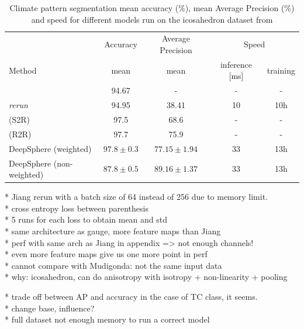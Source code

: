 \documentclass{article} %
\begin{document}
\begin{table}
	\begin{tabular}{l|c c c c}
	\multicolumn{1}{l}{} & Accuracy & Average Precision & \multicolumn{2}{c}{Speed}\\
	\cmidrule(lr){2-2} \cmidrule(lr){3-3} \cmidrule(lr){4-5}
	\multicolumn{1}{l}{Method} & mean & mean & inference [ms] & training \\ \hline
	\cite{jiang_spherical_2019} & 94.67 & - & - & -\\
	\cite{jiang_spherical_2019} \emph{rerun} & 94.95 & 38.41 & 10 & 10h\\
	\cite{cohen_gauge_2019} (S2R) & 97.5 & 68.6 & - & -\\
	\cite{cohen_gauge_2019} (R2R) & 97.7 & 75.9 & - & -\\ \hline
	DeepSphere (weighted) & $97.8\pm 0.3$ & $77.15\pm 1.94$ & 33 & 13h \\
	DeepSphere (non-weighted) & $87.8\pm 0.5$ & $89.16\pm 1.37$ & 33 & 13h\\
	\end{tabular}
	\caption{Climate pattern segmentation mean accuracy (\%), mean Average Precision (\%) and speed for different models run on the icosahedron dataset from \cite{jiang_spherical_2019}}
\end{table}

* Jiang rerun with a batch size of 64 instead of 256 due to memory limit.\\
* cross entropy loss between parenthesis\\
* 5 runs for each loss to obtain mean and std\\
* same architecture as gauge, more feature maps than Jiang\\
* perf with same arch as Jiang in appendix => not enough channels!\\
* even more feature maps give us one more point in perf\\
* cannot compare with Mudigonda: not the same input data\\
* why: icosahedron, can do anisotropy with isotropy + non-linearity + pooling

* trade off between AP and accuracy in the case of TC class, it seems.\\
* change base, influence?\\

* full dataset not enough memory to run a correct model
\end{document}

